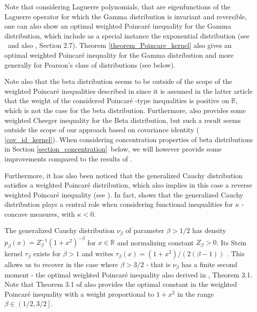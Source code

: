 \documentclass[11pt]{article}
\begin{document}
Note that considering Laguerre polynomials, that are eigenfunctions of the
Laguerre operator for which the Gamma distribution is invariant and
reversible, one can also show an optimal weighted Poincar\'{e} inequality
for the Gamma distribution, which include as a special instance the
exponential distribution (see \cite{MR1440138}\ and also \cite%
{bakry2014analysis}, Section 2.7). Theorem \ref{theorem_Poincare_kernel}
also gives an optimal weighted Poincar\'{e} inequality for the Gamma
distribution and more generally for Pearson's class of distributions (see
below).

Note also that the beta distribution seems to be outside of the scope of the
weighted Poincar\'{e} inequalities described in \cite{MR3519678} since it is
assumed in the latter article that the weight of the considered Poincar\'{e}%
-type inequalities is positive on $\mathbb{R}$, which is not the case for
the beta distribution. Furthermore, \cite{BobkovLedoux:14} also provides
some weighted Cheeger inequality for the Beta distribution, but such a
result seems outside the scope of our approach based on covariance identity (%
\ref{cov_id_kernel}). When considering concentration properties of beta
distributions in Section \ref{section_concentration}\ below, we will however
provide some improvements compared to the results of \cite{BobkovLedoux:14}.

Furthermore, it has also been noticed that the generalized Cauchy
distribution satisfies a weighted Poincar\'{e} distribution, which also
implies in this case a reverse weighted Poincar\'{e} inequality (see 
\cite{MR2510011, MR3519678}%
). In fact, \cite{MR2510011} shows that the generalized Cauchy distribution
plays a central role when considering functional inequalities for $\kappa $%
-concave measures, with $\kappa <0$.

The generalized Cauchy distribution $\nu _{\beta }$ of parameter $\beta >1/2$
has density $p_{\beta }\left( x\right) =Z_{\beta }^{-1}\left( 1+x^{2}\right)
^{-\beta }$ for $x\in \mathbb{R}$ and normalizing constant $Z_{\beta }>0$.
Its Stein kernel $\tau _{\beta }$ exists for $\beta >1$ and writes $\tau
_{\beta }\left( x\right) =\left( 1+x^{2}\right) /(2\left( \beta -1\right) )$%
. This allows us to recover in the case where $\beta >3/2$ - that is $\nu
_{\beta }$ has a finite second moment - the optimal weighted Poincar\'{e}
inequality also derived in \cite{MR3519678}, Theorem 3.1. Note that Theorem
3.1 of \cite{MR3519678} also provides the optimal constant in the weighted
Poincar\'{e} inequality with a weight proportional to $1+x^{2}$ in the range 
$\beta \in \left( 1/2,3/2\right] $.
\end{document}
